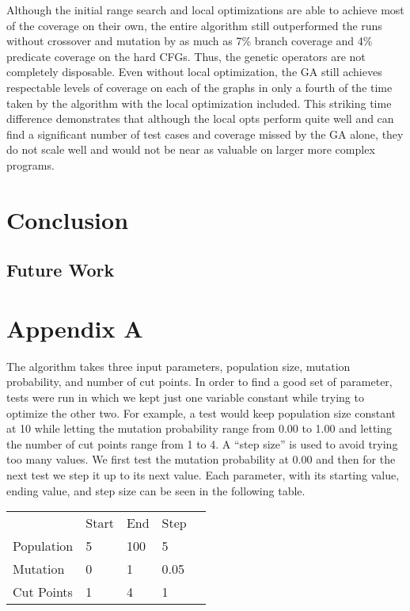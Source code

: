\documentclass[runningheads]{llncs}
\begin{document}
Although the initial range search and local optimizations are able to achieve most of the coverage on their own, the entire algorithm still outperformed the runs without crossover and mutation by as much as 7\% branch coverage and 4\% predicate coverage on the hard CFGs. Thus, the genetic operators are not completely disposable. Even without local optimization, the GA still achieves respectable levels of coverage on each of the graphs in only a fourth of the time taken by the algorithm with the local optimization included. This striking time difference demonstrates that although the local opts perform quite well and can find a significant number of test cases and coverage missed by the GA alone, they do not scale well and would not be near as valuable on larger more complex programs.

\newpage
\section{Conclusion}


\subsection{Future Work}

\newpage
\section*{Appendix A}

The algorithm takes three input parameters, population size, mutation probability, and number of cut points. In order to find a good set of parameter, tests were run in which we kept just one variable constant while trying to optimize the other two. For example, a test would keep population size constant at 10 while letting the mutation probability range from 0.00 to 1.00 and letting the number of cut points range from 1 to 4. A ``step size'' is used to avoid trying too many values. We first test the mutation probability at 0.00 and then for the next test we step it up to its next value. Each parameter, with its starting value, ending value, and step size can be seen in the following table.

\begin{table}[h]
\begin{tabular}{l|l|l|l|l}
	\cline{2-4}
	                                 & Start & End & Step &  \\ \cline{1-4}
	\multicolumn{1}{|l|}{Population} & 5     & 100 & 5    &  \\ \cline{1-4}
	\multicolumn{1}{|l|}{Mutation}   & 0     & 1   & 0.05 &  \\ \cline{1-4}
	\multicolumn{1}{|l|}{Cut Points} & 1     & 4   & 1    &  \\ \cline{1-4}
\end{tabular}
\end{table}
\end{document}
